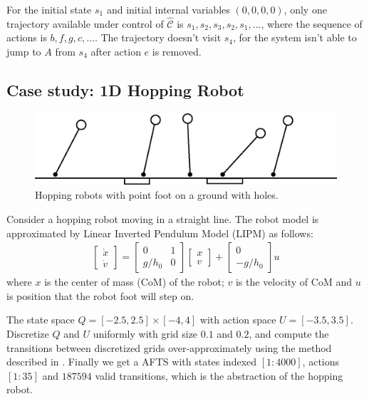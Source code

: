 For the initial state $ s_1 $ and initial internal variables $ (0,0,0,0) $, only one trajectory available under control of $\widehat{\mathcal{C}} $ is $ s_1,s_2,s_3,s_2,s_1,...$, where the sequence of actions is $ b,f,g,c,... $. The trajectory doesn't visit $ s_4 $, for the system isn't able to jump to $ A $ from $ s_4 $ after action $ e $ is removed.

\subsection{Case study: 1D Hopping Robot}

\begin{figure}
	\centering
	\includegraphics[width=0.8\linewidth]{pic/hop_rob}
	\caption{Hopping robots with point foot on a ground with holes.}
	\label{fig:hoprob}
\end{figure}


Consider a hopping robot moving in a straight line. The robot model is approximated by  Linear Inverted Pendulum Model (LIPM) as follows:
\begin{align}
\begin{bmatrix}
\dot{x}\\
\dot{v}
\end{bmatrix} = \begin{bmatrix}
0 & 1\\
g/h_0 & 0
\end{bmatrix}\begin{bmatrix}
x\\
v
\end{bmatrix}+\begin{bmatrix}
0\\-g/h_0
\end{bmatrix} u \label{eqn: model}
\end{align}
where $x$ is the center of mass (CoM) of the robot; $v$ is the velocity of CoM and $ u $ is position that the robot foot will step on. 

The state space $ Q = [-2.5,2.5]\times [-4,4] $ with action space $ U = [-3.5,3.5] $. Discretize $ Q $ and $ U $ uniformly with grid size $ 0.1 $ and $ 0.2 $, and compute the transitions between discretized grids over-approximately  using the method described in \cite{Liu2014,Sun2014}. Finally we get a AFTS with states indexed $ [1:4000] $, actions $ [1:35] $ and $ 187594 $ valid transitions, which is the abstraction of the hopping robot. 

